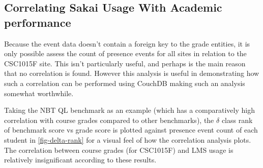 \subsection{Correlating Sakai Usage With Academic performance}
Because the event data doesn't contain a foreign key to the grade entities, it is only possible assess the count of presence events for all sites in relation to the CSC1015F site. This isn't particularly useful, and perhaps is the main reason that no correlation is found. However this analysis is useful in demonstrating how such a correlation can be performed using CouchDB making such an analysis somewhat worthwhile.

Taking the NBT QL benchmark as an example (which has a comparatively high correlation with course grades compared to other benchmarks), the \( \delta \) class rank of benchmark score vs grade score is plotted against presence event count of each student in \ref{fig-delta-rank} for a visual feel of how the correlation analysis plots. The correlation between course grades (for CSC1015F) and LMS usage is relatively insignificant according to these results.

